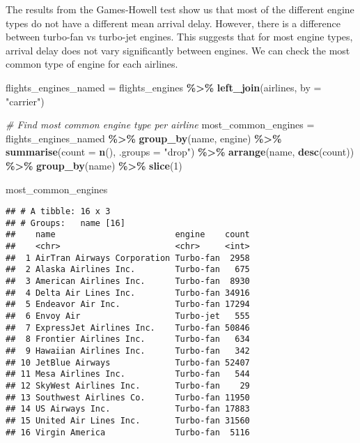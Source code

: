 \documentclass[
]{article}
\newenvironment{Shaded}{\begin{snugshade}}{\end{snugshade}}
\newcommand{\AttributeTok}[1]{\textcolor[rgb]{0.13,0.29,0.53}{#1}}
\newcommand{\CommentTok}[1]{\textcolor[rgb]{0.56,0.35,0.01}{\textit{#1}}}
\newcommand{\DecValTok}[1]{\textcolor[rgb]{0.00,0.00,0.81}{#1}}
\newcommand{\FunctionTok}[1]{\textcolor[rgb]{0.13,0.29,0.53}{\textbf{#1}}}
\newcommand{\NormalTok}[1]{#1}
\newcommand{\OtherTok}[1]{\textcolor[rgb]{0.56,0.35,0.01}{#1}}
\newcommand{\SpecialCharTok}[1]{\textcolor[rgb]{0.81,0.36,0.00}{\textbf{#1}}}
\newcommand{\StringTok}[1]{\textcolor[rgb]{0.31,0.60,0.02}{#1}}
\begin{document}
The results from the Games-Howell test show us that most of the
different engine types do not have a different mean arrival delay.
However, there is a difference between turbo-fan vs turbo-jet engines.
This suggests that for most engine types, arrival delay does not vary
significantly between engines. We can check the most common type of
engine for each airlines.

\begin{Shaded}
\begin{Highlighting}[]
\NormalTok{flights\_engines\_named }\OtherTok{=}\NormalTok{ flights\_engines }\SpecialCharTok{\%\textgreater{}\%}
  \FunctionTok{left\_join}\NormalTok{(airlines, }\AttributeTok{by =} \StringTok{"carrier"}\NormalTok{)}

\CommentTok{\# Find most common engine type per airline}
\NormalTok{most\_common\_engines }\OtherTok{=}\NormalTok{ flights\_engines\_named }\SpecialCharTok{\%\textgreater{}\%}
  \FunctionTok{group\_by}\NormalTok{(name, engine) }\SpecialCharTok{\%\textgreater{}\%}
  \FunctionTok{summarise}\NormalTok{(}\AttributeTok{count =} \FunctionTok{n}\NormalTok{(), }\AttributeTok{.groups =} \StringTok{"drop"}\NormalTok{) }\SpecialCharTok{\%\textgreater{}\%}
  \FunctionTok{arrange}\NormalTok{(name, }\FunctionTok{desc}\NormalTok{(count)) }\SpecialCharTok{\%\textgreater{}\%}
  \FunctionTok{group\_by}\NormalTok{(name) }\SpecialCharTok{\%\textgreater{}\%}
  \FunctionTok{slice}\NormalTok{(}\DecValTok{1}\NormalTok{) }

\NormalTok{most\_common\_engines}
\end{Highlighting}
\end{Shaded}

\begin{verbatim}
## # A tibble: 16 x 3
## # Groups:   name [16]
##    name                        engine    count
##    <chr>                       <chr>     <int>
##  1 AirTran Airways Corporation Turbo-fan  2958
##  2 Alaska Airlines Inc.        Turbo-fan   675
##  3 American Airlines Inc.      Turbo-fan  8930
##  4 Delta Air Lines Inc.        Turbo-fan 34916
##  5 Endeavor Air Inc.           Turbo-fan 17294
##  6 Envoy Air                   Turbo-jet   555
##  7 ExpressJet Airlines Inc.    Turbo-fan 50846
##  8 Frontier Airlines Inc.      Turbo-fan   634
##  9 Hawaiian Airlines Inc.      Turbo-fan   342
## 10 JetBlue Airways             Turbo-fan 52407
## 11 Mesa Airlines Inc.          Turbo-fan   544
## 12 SkyWest Airlines Inc.       Turbo-fan    29
## 13 Southwest Airlines Co.      Turbo-fan 11950
## 14 US Airways Inc.             Turbo-fan 17883
## 15 United Air Lines Inc.       Turbo-fan 31560
## 16 Virgin America              Turbo-fan  5116
\end{verbatim}
\end{document}
